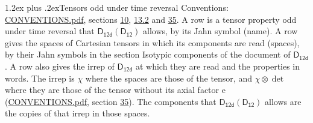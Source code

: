 \documentclass[10pt,a4paper]{article}
\makeatletter
\renewcommand\section{\@startsection{section}{1}{\z@}{-3ex plus -1ex minus -.2ex}%
  {1.2ex plus .2ex}{\normalfont\large\sffamily\bfseries\color{parttitle}}}
\numberwithin{equation}{section}
\newcommand{\grp}[1]{\mathsf{#1}}
\newcommand{\irrprod}{\otimes}
\makeatother
\begin{document}
\section{Tensors odd under time reversal}\label{s:time_odd}
Conventions: \href{../../CONVENTIONS.pdf}{CONVENTIONS.pdf}, sections \href{../../../rotation/CONVENTIONS.pdf\#conv.10}{10}, \href{../../../rotation/CONVENTIONS.pdf\#conv.13.2}{13.2} and \href{../../CONVENTIONS.pdf\#conv.35}{35}.
\leavevmode\label{n:head.name.property}A row is a tensor property odd under time reversal that $\grp{D_{12d}}(\grp{D_{12}})$ allows, by its Jahn symbol (name). \label{n:head.spaces}A row gives the spaces of Cartesian tensors in which its components are read (spaces), by their Jahn symbols in the section Isotypic components of the document of \href{../../../rotation/data/pdf/D12d.pdf}{$\grp{D_{12d}}$}. \label{n:head.properties}A row also gives the irrep of $\grp{D_{12d}}$ at which they are read and the properties in words. The irrep is $\chi$ where the spaces are those of the tensor, and $\chi \irrprod \det$ where they are those of the tensor without its axial factor e (\href{../../CONVENTIONS.pdf}{CONVENTIONS.pdf}, section \href{../../CONVENTIONS.pdf\#conv.35}{35}). The components that $\grp{D_{12d}}(\grp{D_{12}})$ allows are the copies of that irrep in those spaces.
\end{document}
